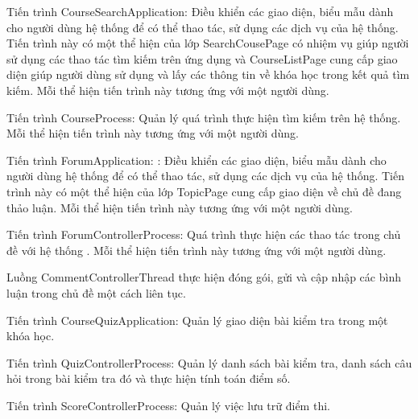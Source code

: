 \documentclass[./../main_file.tex]{subfiles}
\begin{document}
\begin{description}
\item Tiến trình CourseSearchApplication: Điều khiển các giao diện, biểu mẫu dành cho người dùng hệ thống để có thể thao tác, sử dụng các dịch vụ của hệ thống. Tiến trình này có một thể hiện của lớp SearchCousePage có nhiệm vụ giúp người sử dụng các thao tác tìm kiếm trên ứng dụng và CourseListPage cung cấp giao diện giúp người dùng sử dụng và lấy các thông tin về khóa học trong kết quả tìm kiếm.
Mỗi thể hiện tiến trình này tương ứng với một người dùng.
\item Tiến trình CourseProcess: Quản lý quá trình thực hiện tìm kiếm trên hệ thống.
Mỗi thể hiện tiến trình này tương ứng với một người dùng.

\item Tiến trình ForumApplication: : Điều khiển các giao diện, biểu mẫu dành cho người dùng hệ thống để có thể thao tác, sử dụng các dịch vụ của hệ thống. Tiến trình này có một thể hiện của lớp TopicPage cung cấp giao diện về chủ đề đang thảo luận.
Mỗi thể hiện tiến trình này tương ứng với một người dùng.
\item Tiến trình ForumControllerProcess: Quá trình thực hiện các thao tác trong chủ đề với hệ thống .
Mỗi thể hiện tiến trình này tương ứng với một người dùng.
\item Luồng CommentControllerThread thực hiện đóng gói, gửi và cập nhập các bình luận trong chủ đề một cách liên tục.

\item Tiến trình CourseQuizApplication: Quản lý giao diện bài kiểm tra trong một khóa học.
\item Tiến trình QuizControllerProcess: Quản lý danh sách bài kiểm tra, danh sách câu hỏi trong bài kiểm tra đó và thực hiện tính toán điểm số.
\item Tiến trình ScoreControllerProcess: Quản lý việc lưu trữ điểm thi.


\end{description}
\end{document}
